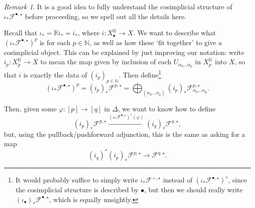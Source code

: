 \documentclass[11pt,fleqn]{article}
\theoremstyle{plain}
\theoremstyle{definition}
\theoremstyle{remark}
\newtheorem{remark}[theorem]{Remark}
\numberwithin{equation}{theorem}
\newcommand{\cover}{\mathcal{U}}
\newcommand{\anotherbullet}{\star}
\newcommand{\yetanotherbullet}{\diamond}
\newcommand{\nerve}[1]{X_{#1}^\cover}
\begin{document}
        \begin{remark}\label{remark:what-is-the-pushforward-as-cosimplicial-object}
            It is a good idea to fully understand the cosimplicial structure of $\iota_*\mathcal{F}^{\bullet,\anotherbullet}$ before proceeding, so we spell out all the details here.

            Recall that $\iota_* = \mathbb{R}i_* = i_*$, where $i\colon\nerve{\bullet}\to X$.
            We want to describe what $(\iota_*\mathcal{F}^{\bullet,\anotherbullet})^p$ is for each $p\in\mathbb{N}$, as well as how these `fit together' to give a cosimplicial object.
            This can be explained by just improving our notation: write $i_p\colon\nerve{p}\to X$ to mean the map given by inclusion of each $U_{\alpha_0\ldots\alpha_p}$ in $\nerve{p}$ into $X$, so that $i$ is exactly the data of $(i_p)_{p\in\mathbb{N}}$.
            Then define\footnote{It would probably suffice to simply write $\iota_*\mathcal{F}^{\yetanotherbullet,\anotherbullet}$ instead of $(\iota_*\mathcal{F}^{\bullet,\anotherbullet})^\yetanotherbullet$, since the cosimplicial structure is described by $\bullet$, but then we should really write $(\iota_{\bullet})_*\mathcal{F}^{\bullet,\anotherbullet}$, which is equally unsightly.}
            \[
                (\iota_*\mathcal{F}^{\bullet,\anotherbullet})^p
                =
                (i_p)_*\mathcal{F}^{p,\anotherbullet}
                =
                \bigoplus_{(\alpha_0\ldots\alpha_p)} (i_p)_* \mathcal{F}^{p,\anotherbullet}_{\alpha_0\ldots\alpha_p}.
            \]

            Then, given some $\varphi\colon[p]\to[q]$ in $\Delta$, we want to know how to define
            \[
                (i_p)_*\mathcal{F}^{p,\anotherbullet}
                \xrightarrow{(\iota_*\mathcal{F}^{\bullet,\anotherbullet})^\yetanotherbullet(\varphi)}
                (i_q)_*\mathcal{F}^{q,\anotherbullet},
            \]
            but, using the pullback/pushforward adjunction, this is the same as asking for a map
            \[
                (i_q)^*(i_p)_*\mathcal{F}^{p,\anotherbullet}
                \longrightarrow
                \mathcal{F}^{q,\anotherbullet}.
            \]


\end{remark}
\end{document}
